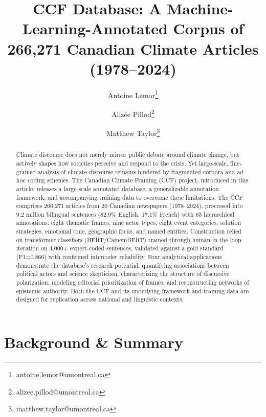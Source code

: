 \documentclass[12pt]{article}
\title{\textbf{CCF Database: A Machine-Learning-Annotated Corpus of 266,271 Canadian Climate Articles (1978–2024)}}
\author[1]{Antoine Lemor\thanks{antoine.lemor@umontreal.ca}}
\author[2]{Alizée Pillod\thanks{alizee.pillod@umontreal.ca}}
\author[2]{Matthew Taylor\thanks{matthew.taylor@umontreal.ca}}
\affil[1]{Université de Sherbrooke}
\affil[2]{Université de Montréal}
\date{}
\renewcommand\_{\texttt{\detokenize{_}\allowbreak}}
\begin{document}
\maketitle
\thispagestyle{empty}


\begin{abstract}
\noindent
Climate discourse does not merely mirror public debate around climate change, but actively shapes how societies perceive and respond to the crisis. Yet large-scale, fine-grained analysis of climate discourse remains hindered by fragmented corpora and ad hoc coding schemes. The Canadian Climate Framing (CCF) project, introduced in this article, releases a large-scale annotated database, a generalizable annotation framework, and accompanying training data to overcome these limitations. The CCF comprises 266,271 articles from 20 Canadian newspapers (1978–2024), processed into 9.2 million bilingual sentences (82.9\% English, 17.1\% French) with 65 hierarchical annotations: eight thematic frames, nine actor types, eight event categories, solution strategies, emotional tone, geographic focus, and named entities. Construction relied on transformer classifiers (BERT/CamemBERT) trained through human-in-the-loop iteration on 4,000+ expert-coded sentences, validated against a gold standard (F1=0.866) with confirmed intercoder reliability. Four analytical applications demonstrate the database’s research potential: quantifying associations between political actors and science skepticism, characterizing the structure of discursive polarization, modeling editorial prioritization of frames, and reconstructing networks of epistemic authority. Both the CCF and its underlying framework and training data are designed for replication across national and linguistic contexts.
\end{abstract}

\newpage

\section{Background \& Summary}
\end{document}
